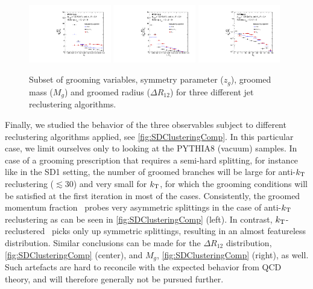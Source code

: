 \begin{figure}[th]
\centering
\includegraphics[width=0.32\textwidth]
{figures/SDAlgorithms/zgClusteringComp.pdf}
\includegraphics[width=0.32\textwidth]
{figures/SDAlgorithms/rgClusteringComp.pdf}
\includegraphics[width=0.32\textwidth]
{figures/SDAlgorithms/mgClusteringComp.pdf}%
\caption{Subset of grooming variables, symmetry parameter ($z_{g}$), groomed mass ($M_{g}$) and groomed radius ($\Delta R_{12}$) for three different jet reclustering algorithms.}
\label{fig:SDClusteringComp}
\end{figure}
Finally, we studied the behavior of the three observables subject to different reclustering algorithms applied, see \autoref{fig:SDClusteringComp}. In this particular case, we limit ourselves only to looking at the PYTHIA8 (vacuum) samples.
In case of a grooming prescription that requires a semi-hard splitting, for instance like in the SD1 setting,
the number of groomed branches will be large for anti-$k_{\rm \tiny T}$ reclustering ($\lesssim 30$) and very small for $k_{\rm \tiny T}$, for which the grooming conditions will be satisfied at the first iteration in most of the cases. Consistently, the groomed momentum fraction \zg\, probes very asymmetric splittings in the case of anti-$k_{\rm \tiny T}$ reclustering as can be seen in \autoref{fig:SDClusteringComp} (left). In contrast, $k_{\rm \tiny T}$-reclustered \zg\, picks only up symmetric splittings, resulting in an almost featureless distribution. Similar conclusions can be made for the $\Delta R_{12}$ distribution, \autoref{fig:SDClusteringComp} (center), and $M_g$, \autoref{fig:SDClusteringComp} (right), as well. Such artefacts are hard to reconcile with the expected behavior from QCD theory, and will therefore generally not be pursued further.


